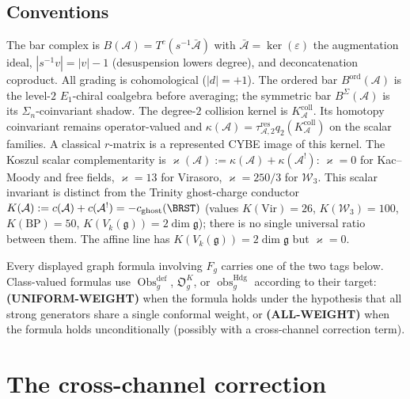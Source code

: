 \documentclass[11pt]{article}
\theoremstyle{definition}
\theoremstyle{remark}
\newcommand{\cA}{\mathcal{A}}
\newcommand{\Walg}{\mathcal{W}}
\newcommand{\fg}{\mathfrak{g}}
\newcommand{\Vir}{\mathrm{Vir}}
\DeclareMathOperator{\ord}{ord}
\numberwithin{equation}{section}
\begin{document}
\subsection{Conventions}

The bar complex is $B(\cA) = T^c(s^{-1}\bar{\cA})$ with
$\bar{\cA} = \ker(\varepsilon)$ the augmentation ideal,
$|s^{-1}v| = |v| - 1$ (desuspension lowers degree), and
deconcatenation coproduct.
All grading is cohomological ($|d| = +1$).
The ordered bar $B^{\ord}(\cA)$ is the level-$2$ $E_1$-chiral
coalgebra before averaging; the symmetric bar $B^{\Sigma}(\cA)$ is its
$\Sigma_n$-coinvariant shadow.
The degree-$2$ collision kernel is $K_\cA^{\mathrm{coll}}$.
Its homotopy coinvariant remains operator-valued and
$\kappa(\cA)=\tau_{\cA,2}^{\mathrm{res}}
q_2(K_\cA^{\mathrm{coll}})$ on the scalar families. A classical
$r$-matrix is a represented CYBE image of this kernel.
The Koszul scalar complementarity is $\varkappa(\cA) := \kappa(\cA) + \kappa(\cA^!)$:
$\varkappa = 0$ for Kac--Moody and free fields, $\varkappa = 13$ for Virasoro,
$\varkappa = 250/3$ for $\Walg_3$. This scalar invariant is distinct from the
Trinity ghost-charge conductor $K(\cA) := c(\cA) + c(\cA^!) = -c_{\mathrm{ghost}}(\BRST)$
(values $K(\Vir)=26$, $K(\Walg_3)=100$, $K(\mathrm{BP})=50$, $K(V_k(\fg))=2\dim\fg$);
there is no single universal ratio between them. The affine line has
$K(V_k(\fg))=2\dim\fg$ but $\varkappa=0$.

Every displayed graph formula involving $F_g$ carries one of the two
tags below.  Class-valued formulas use
$\operatorname{Obs}^{\mathrm{def}}_g$, $\mathfrak O_g^K$, or
$\operatorname{obs}^{\mathrm{Hdg}}_g$ according to their target:
\textbf{(UNIFORM-WEIGHT)} when the formula holds under the
hypothesis that all strong generators share a single conformal
weight, or \textbf{(ALL-WEIGHT)} when the formula holds
unconditionally (possibly with a cross-channel correction term).


\section{The cross-channel correction}\label{sec:cross-channel}
\end{document}
